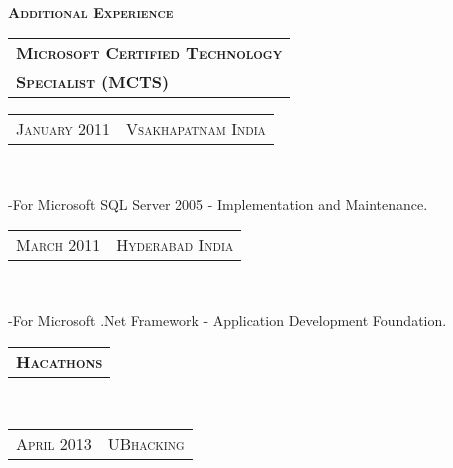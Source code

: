 \documentclass[10pt,a4paper,oneside]{article}
\begin{document}
\begin{minipage}[t]{0.33\textwidth}
{        }
        \vspace{10pt}\\
        \textcolor{light-gray}{\textbf{\large A\textsc{dditional} E\textsc{xperience}}}
        \vspace{10pt}\\
        \begin{tabular}{l}
            \textbf{\normalsize M\textsc{icrosoft} C\textsc{ertified} T\textsc{echnology}}\\
            {\normalsize \textbf{S\textsc{pecialist} (MCTS)}}
        \end{tabular}
        \vspace{2pt}
        \textcolor{light-gray}{
            \begin{tabular}{c|c}
                {\small J\textsc{anuary 2011}}
                &{\small V\textsc{sakhapatnam} I\textsc{ndia}}
            \end{tabular}
        }\\
        \vspace{-12pt}
        \begin{adjustwidth}{7pt}{0pt}
            {\footnotesize -For Microsoft SQL Server 2005 - Implementation and Maintenance.}\\
        \end{adjustwidth}
        \textcolor{light-gray}{
            \begin{tabular}{c|c}
                {\small M\textsc{arch 2011}}
                &{\small H\textsc{yderabad} I\textsc{ndia}}
            \end{tabular}
        }\\
        \vspace{-12pt}
        \begin{adjustwidth}{7pt}{0pt}
        {\footnotesize -For Microsoft .Net Framework - Application Development Foundation.}\\
        \end{adjustwidth}
        \begin{tabular}{c}
            \textbf{\normalsize H\textsc{acathons}}
        \end{tabular}\\
        \textcolor{light-gray}{
            \begin{tabular}{c|c}
                {\small A\textsc{pril 2013}}
                &{\small UB\textsc{hacking}}
            \end{tabular}
        }\\
        \vspace{-12pt}

\end{minipage}
\end{document}
